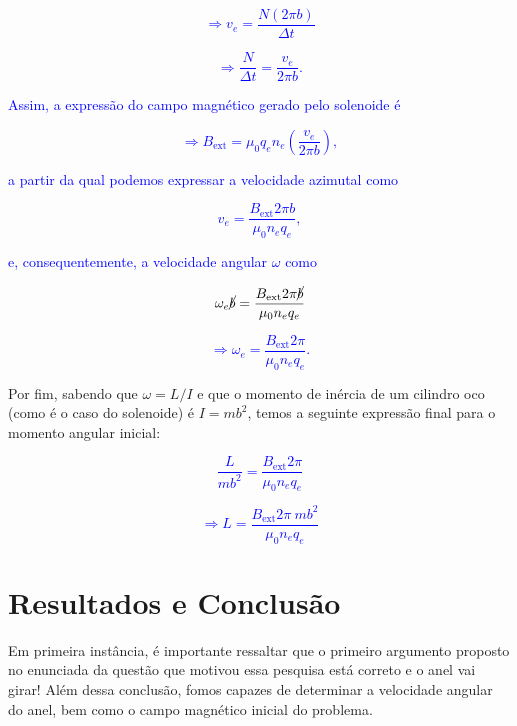 \documentclass[
	article,
	11pt,
	oneside,
	a4paper,
	english,
	brazil,
	sumario=tradicional
	]{abntex2}
\begin{document}
\textcolor{blue}{\begin{equation}
    \Rightarrow v_e = \frac{N(2\pi b)}{\Delta t}
\end{equation}}

\textcolor{blue}{\begin{equation}
    \Rightarrow \frac{N}{\Delta t} = \frac{v_e}{2\pi b}.
\end{equation}}

\textcolor{blue}{Assim, a expressão do campo magnético gerado pelo solenoide é}

\textcolor{blue}{\begin{equation}
    \Rightarrow B_{\text{ext}} = \mu_0 q_e n_e \left(\frac{v_e}{2\pi b}\right),
\end{equation}}


\noindent\textcolor{blue}{a partir da qual podemos expressar a velocidade azimutal como}


\textcolor{blue}{\begin{equation}
    v_e = \frac{B_{\text{ext}} 2\pi b}{\mu_0 n_e q_e},
\end{equation}}

\noindent\textcolor{blue}{e, consequentemente, a velocidade angular $\omega$ como}

\textcolor{blue}{\begin{equation}
    \omega_e \cancel{b} = \frac{B_{\text{ext}} 2\pi \cancel{b}}{\mu_0 n_e q_e}
\end{equation}}

\textcolor{blue}{\begin{equation}
    \Rightarrow\omega_e = \frac{B_{\text{ext}} 2\pi}{\mu_0 n_e q_e}.
\end{equation}}

Por fim, sabendo que $\omega = L/I$ e que o momento de inércia de um cilindro oco (como é o caso do solenoide) é $I = m b^2$, temos a seguinte expressão final para o momento angular inicial:

\textcolor{blue}{\begin{equation}
    \frac{L}{m b^2} = \frac{B_{\text{ext}} 2\pi}{\mu_0 n_e q_e}
\end{equation}}

\textcolor{blue}{\begin{equation}
    \Rightarrow L = \frac{B_{\text{ext}} 2\pi~m b^2}{\mu_0 n_e q_e}
\end{equation}}





\section{Resultados e Conclusão}

Em primeira instância, é importante ressaltar que o primeiro argumento proposto no enunciada da questão que motivou essa pesquisa está correto e o anel vai girar! Além dessa conclusão, fomos capazes de determinar a velocidade angular do anel, bem como o campo magnético inicial do problema.

\nocite{leclair_2008, reville_2016}

\pagebreak
\onecolumn{
\postextual

}
\end{document}
